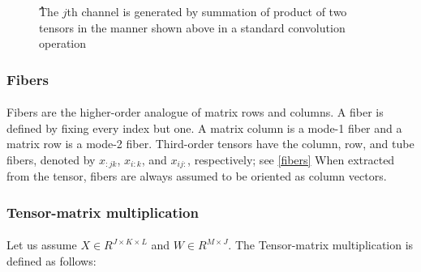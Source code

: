\documentclass{report}
\begin{document}
\begin{figure}[h!]
\begin{center}
{}
	\caption{
	ُThe $j$th channel is generated by summation of product of two tensors in the manner shown above in a standard convolution operation}
\end{center}
\end{figure}


\subsubsection{
	Fibers
	\cite{kolda}
}

\paragraph*{}
Fibers are the higher-order analogue of matrix rows and columns. A fiber is
defined by fixing every index but one. A matrix column is a mode-1 fiber and a
matrix row is a mode-2 fiber. Third-order tensors have the column, row, and tube fibers,
denoted by $ x_{:jk} $, $ x_{i:k} $, and $ x_{ij:} $, respectively; see 
\ref{fibers}
When extracted from the
tensor, fibers are always assumed to be oriented as column vectors.






\subsubsection{
	Tensor-matrix multiplication\cite{rezghi}
}

\paragraph*{}
Let us assume $ X \in R^{J\times K\times L} $ and $ W\in R^{M\times J} $.
The Tensor-matrix multiplication is defined as follows:
\end{document}
